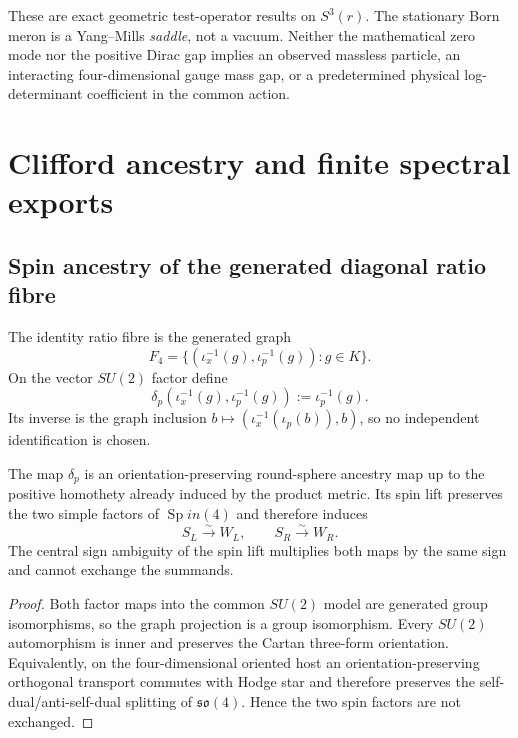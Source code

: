 \documentclass[12pt,a4paper]{article}
\begin{document}
\begin{remark}
\label{p3b:rem:v349-meron-spectrum-physical-guard}
These are exact geometric test-operator results on $S^3(r)$.
The stationary Born meron is a Yang--Mills \emph{saddle}, not a
vacuum.  Neither the mathematical zero mode nor the positive
Dirac gap implies an observed massless particle, an interacting
four-dimensional gauge mass gap, or a predetermined physical
log-determinant coefficient in the common action.
\end{remark}


\section{Clifford ancestry and finite spectral exports}
\label{paper3b:sec:organized-exports}
\label{p3:part:appendices}
\subsection{Spin ancestry of the generated diagonal ratio fibre}
\label{p3b:sec:diagonal-spin-ancestry-update}

The identity ratio fibre is the generated graph
\[
 F_4=\{(\iota_x^{-1}(g),\iota_p^{-1}(g)):g\in K\}.
\]
On the vector $SU(2)$ factor define
\[
 \delta_p(\iota_x^{-1}(g),\iota_p^{-1}(g)):=\iota_p^{-1}(g).
\]
Its inverse is the graph inclusion
$b\mapsto(\iota_x^{-1}(\iota_p(b)),b)$, so no independent identification is
chosen.

\begin{theorem}
\label{p3b:thm:diagonal-fibre-spin-ancestry}
The map $\delta_p$ is an orientation-preserving round-sphere ancestry map up
to the positive homothety already induced by the product metric.  Its spin
lift preserves the two simple factors of $\operatorname{Sp}in(4)$ and therefore induces
\[
 S_L\overset\sim\longrightarrow W_L,
 \qquad
 S_R\overset\sim\longrightarrow W_R.
\]
The central sign ambiguity of the spin lift multiplies both maps by the same
sign and cannot exchange the summands.
\end{theorem}

\begin{proof}
Both factor maps into the common $SU(2)$ model are generated group
isomorphisms, so the graph projection is a group isomorphism.  Every
$SU(2)$ automorphism is inner and preserves the Cartan three-form orientation.
Equivalently, on the four-dimensional oriented host an
orientation-preserving orthogonal transport commutes with Hodge star and
therefore preserves the self-dual/anti-self-dual splitting of
$\mathfrak{so}(4)$.  Hence the two spin factors are not exchanged.
\end{proof}
\end{document}
